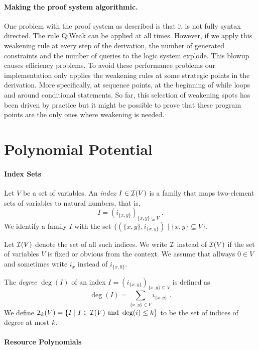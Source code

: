 \documentclass[10pt]{article}
\begin{document}
\paragraph{Making the proof system algorithmic.}
One problem with the proof system as described is that it is not
fully syntax directed.  The rule {\sc Q:Weak} can be applied at
all times.  However, if we apply this weakening rule at every step
of the derivation, the number of generated constraints and
the number of queries to the logic system explode.  This blowup
causes efficiency problems.  To avoid these performance problems
our implementation only applies the weakening rules at some
strategic points in the derivation.  More specifically, at sequence
points, at the beginning of while loops and around conditional
statements.  So far, this selection of weakening spots has been
driven by practice but it might be possible to prove that these
program points are the only ones where weakening is needed.


\section{Polynomial Potential}

\paragraph{Index Sets}

Let $V$ be a set of variables.  An \emph{index} $I \in \mathcal{I}(V)$ is a
family that maps two-element sets of variables to natural numbers,
that is,
$$
I = (i_{\{x,y\}})_{\{x,y\} \subseteq V} \; .
$$
%
We identify a family $I$ with the set $\{ (\{x,y\},i_{\{x,y\}})
\mid \{x,y\} \subseteq V\}$.

Let $\mathcal{I}(V)$ denote the set of all such indices.  We write $\mathcal{I}$
instead of $\mathcal{I}(V)$ if the set of variables $V$ is fixed or obvious
from the context.
%
We assume that allways $0 \in V$ and sometimes write $i_x$ instead of $i_{\{x,0\}}$.

The \emph{degree} $\deg(I)$ of an index $I = (i_{\{x,y\}})_{\{x,y\}
  \subseteq V}$ is defined as
$$
\deg(I) = \sum_{\{x,y\} \in V} i_{\{x,y\}} \;.
$$
We define $\mathcal{I}_k(V) = \{ I \mid I \in \mathcal{I}(V) \text{ and } \deg(i) \leq k
\}$ to be the set of indices of degree at most $k$.

\paragraph{Resource Polynomials}
\end{document}
